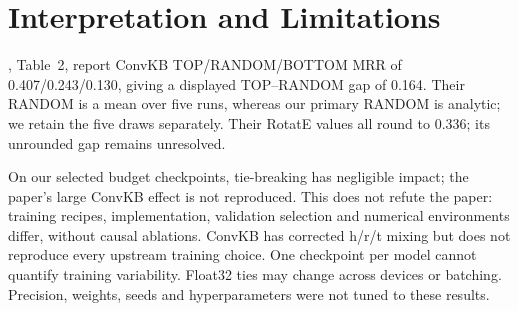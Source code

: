 \section{Interpretation and Limitations}
\label{sec:gosha-discussion}
\citet{sun-etal-2020-evaluation}, Table~2, report ConvKB
TOP/RANDOM/BOTTOM MRR of 0.407/0.243/0.130, giving a displayed TOP--RANDOM
gap of 0.164. Their RANDOM is a mean over five runs, whereas our primary
RANDOM is analytic; we retain the five draws separately. Their RotatE values
all round to 0.336; its unrounded gap remains unresolved.

On our selected budget checkpoints, tie-breaking has negligible impact;
the paper's large ConvKB effect is not reproduced. This does not refute the
paper: training recipes, implementation, validation selection and numerical
environments differ, without causal ablations. ConvKB has corrected h/r/t
mixing but does not reproduce every upstream training choice. One checkpoint
per model cannot quantify training variability. Float32 ties may change
across devices or batching. Precision, weights, seeds and hyperparameters
were not tuned to these results.
